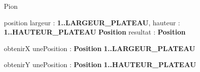 \begin{algorithme}
  
  \begin{enregistrement}{Pion}
  \end{enregistrement}
  
\end{algorithme}

\vspace*{5mm} 

\begin{algorithme}
  \small
  \fonction
      {position}
      {largeur : \textbf{1..LARGEUR\_PLATEAU}, hauteur : \textbf{1..HAUTEUR\_PLATEAU}}
      {\textbf{Position}}
      {resultat : \textbf{Position}}
      {
      }
      
\end{algorithme}

\vspace*{5mm} 

\begin{algorithme}
  \small
  \fonction
      {obtenirX}
      {unePosition : \textbf{Position}}
      {\textbf{1..LARGEUR\_PLATEAU}}
      {}
      {
      }
      
\end{algorithme}

\vspace*{5mm} 

\begin{algorithme}
  \small
  \fonction
      {obtenirY}
      {unePosition : \textbf{Position}}
      {\textbf{1..HAUTEUR\_PLATEAU}}
      {}
      {
      }
      
      
\end{algorithme}
